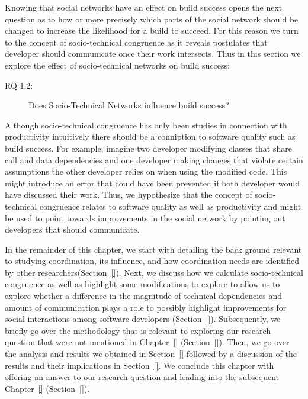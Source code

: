 \label{chap:stc-net2}
Knowing that social networks have an effect on build success opens the next question as to how or more precisely which parts of the social network should be changed to increase the likelihood for a build to succeed.
For this reason we turn to the concept of socio-technical congruence as it reveals postulates that developer should communicate once their work intersects.
Thus in this section we explore the effect of socio-technical networks on build success:

\begin{description}
  \item[RQ 1.2:] Does Socio-Technical Networks influence build success?
\end{description}

Although socio-technical congruence has only been studies in connection with productivity intuitively there should be a conniption to software quality such as build success.
For example, imagine two developer modifying classes that share call and data dependencies and one developer making changes that violate certain assumptions the other developer relies on when using the modified code.
This might introduce an error that could have been prevented if both developer would have discussed their work.
Thus, we hypothesize that the concept of socio-technical congruence relates to software quality as well as productivity and might be used to point towards improvements in the social network by pointing out developers that should communicate.

In the remainder of this chapter, we start with detailing the back ground relevant to studying coordination, its influence, and how coordination needs are identified by other researchers(Section~\ref{}).
Next, we discuss how we calculate socio-technical congruence as well as highlight some modifications to explore to allow us to explore whether a difference in the magnitude of technical dependencies and amount of communication plays a role to possibly highlight improvements for social interactions among software developers (Section~\ref{}).
Subsequently, we briefly go over the methodology that is relevant to exploring our research question that were not mentioned in Chapter~\ref{} (Section~\ref{}).
Then, we go over the analysis and results we obtained in Section~\ref{} followed by a discussion of the results and their implications in Section~\ref{}.
We conclude this chapter with offering an answer to our research question and leading into the subsequent Chapter~\ref{} (Section~\ref{}).


